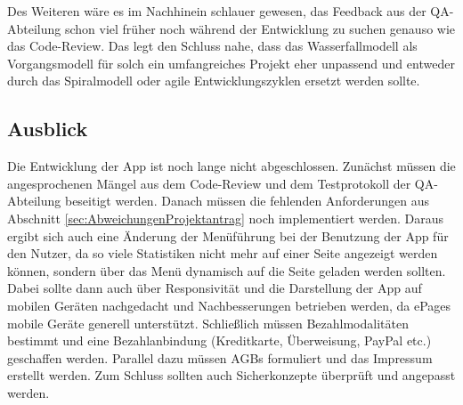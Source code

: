 Des Weiteren wäre es im Nachhinein schlauer gewesen, das Feedback aus der QA-Abteilung schon viel früher noch während der Entwicklung zu suchen genauso wie das Code-Review. Das legt den Schluss nahe, dass das Wasserfallmodell als Vorgangsmodell für solch ein umfangreiches Projekt eher unpassend und entweder durch das Spiralmodell oder agile Entwicklungszyklen ersetzt werden sollte.


\subsection{Ausblick}
\label{sec:Ausblick}

Die Entwicklung der App ist noch lange nicht abgeschlossen. Zunächst müssen die angesprochenen Mängel aus dem Code-Review und  dem Testprotokoll der QA-Abteilung beseitigt werden. Danach müssen die fehlenden Anforderungen aus Abschnitt \ref{sec:AbweichungenProjektantrag} noch implementiert werden. Daraus ergibt sich auch eine Änderung der Menüführung bei der Benutzung der App für den Nutzer, da so viele Statistiken nicht mehr auf einer Seite angezeigt werden können, sondern über das Menü dynamisch auf die Seite geladen werden sollten. Dabei sollte dann auch über Responsivität und die Darstellung der App auf mobilen Geräten nachgedacht und Nachbesserungen betrieben werden, da ePages mobile Geräte generell unterstützt. Schließlich müssen Bezahlmodalitäten bestimmt und eine Bezahlanbindung (Kreditkarte, Überweisung, PayPal etc.) geschaffen werden. Parallel dazu müssen AGBs formuliert und das Impressum erstellt werden. Zum Schluss sollten auch Sicherkonzepte überprüft und angepasst werden.
